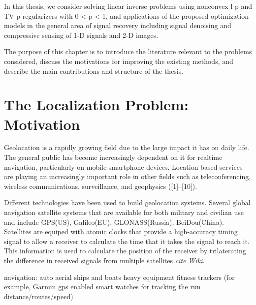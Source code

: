 \label{chapter:introduction}


In this thesis, we consider solving linear inverse problems using nonconvex l p and TV p
regularizers with 0 < p < 1, and applications of the proposed optimization models in
the general area of signal recovery including signal denoising and compressive sensing
of 1-D signals and 2-D images. 

The purpose of this chapter is to introduce the
literature relevant to the problems considered, discuss the motivations for improving
the existing methods, and describe the main contributions and structure of the thesis.

\section{The Localization Problem: Motivation} \label{problem}

Geolocation is a rapidly growing field due to the large impact it has on daily life.  The general public has become increasingly dependent on it for realtime navigation, particularly on mobile smartphone devices. Location-based services are  playing an increasingly important role in other fields such as teleconferencing, wireless communications, surveillance, and geophysics \cite{SmithAbel, ShcauRob, Yao, Huang, CheungChan, LiHu, Cheung, Sayed, classMDS} ([1]–[10]).

Different technologies have been used to build geolocation systems. Several global navigation satellite systems that are available for both military and civilian use and include GPS(US), Galileo(EU), GLONASS(Russia), BeiDou(China). Satellites are equiped with atomic clocks that provide a high-accuracy timing signal to  allow a receiver to calculate the time that it takes the signal to reach it. This information is used to calculate the position of the receiver by trilaterating the difference in received signals from multiple satellites \textit{cite Wiki}.

navigation:
auto
aerial
ships and boats
heavy equipment
fitness trackers (for example, Garmin gps enabled smart watches for tracking the run distance/routes/speed)



